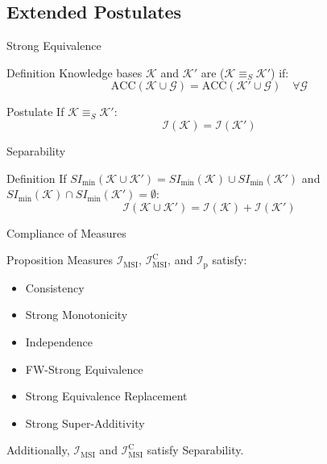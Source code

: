 \subsection{Extended Postulates}

\begin{frame}{Strong Equivalence}
    \begin{block}{Definition}
        Knowledge bases $\mathcal{K}$ and $\mathcal{K}'$ are  ($\mathcal{K} \equiv_S \mathcal{K}'$) if:
        \[
            \text{ACC}(\mathcal{K} \cup \mathcal{G}) = \text{ACC}(\mathcal{K}' \cup \mathcal{G}) \quad \forall \mathcal{G}
        \]
    \end{block}
    \begin{block}{Postulate}
        If $\mathcal{K} \equiv_S \mathcal{K}'$:
        \[
            \mathcal{I}(\mathcal{K}) = \mathcal{I}(\mathcal{K}')
        \]
    \end{block}
\end{frame}

\begin{frame}{Separability}
    \begin{block}{Definition}
        If $SI_{\min}(\mathcal{K} \cup \mathcal{K}') = SI_{\min}(\mathcal{K}) \cup SI_{\min}(\mathcal{K}')$ and $SI_{\min}(\mathcal{K}) \cap SI_{\min}(\mathcal{K}') = \emptyset$:
        \[
            \mathcal{I}(\mathcal{K} \cup \mathcal{K}') = \mathcal{I}(\mathcal{K}) + \mathcal{I}(\mathcal{K}')
        \]
    \end{block}
\end{frame}

\begin{frame}{Compliance of Measures}
    \begin{block}{Proposition}
        Measures $\mathcal{I}_{\text{MSI}}$, $\mathcal{I}_{\text{MSI}}^\text{C}$, and $\mathcal{I}_{\text{p}}$ satisfy:

        \begin{itemize}
            \item Consistency
            \item Strong Monotonicity
            \item Independence
            \item FW-Strong Equivalence
            \item Strong Equivalence Replacement
            \item Strong Super-Additivity
        \end{itemize}

        Additionally, $\mathcal{I}_{\text{MSI}}$ and $\mathcal{I}_{\text{MSI}}^\text{C}$ satisfy Separability.
    \end{block}
\end{frame}

